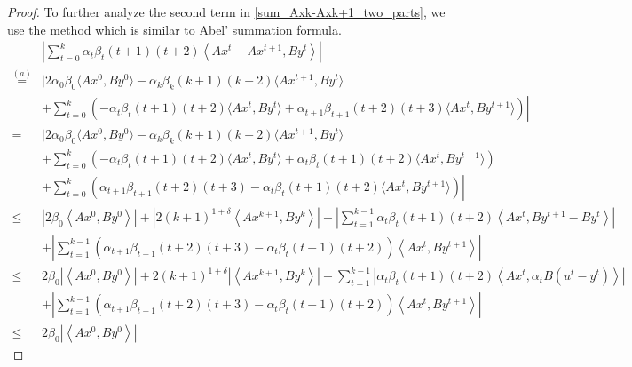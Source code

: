 \documentclass{article}
\numberwithin{equation}{section}
\begin{document}
\begin{proof}
    To further analyze the second term in \eqref{sum_Axk-Axk+1_two_parts}, we use the method which is 
    similar to Abel' summation formula. 
    \begin{align}
        &\left| \sum\limits_{t = 0}^k\alpha_t\beta_{t}(t+1)(t+2)\left\langle Ax^t- Ax^{t+1},By^t \right\rangle \right| \nonumber \\
        \overset{(a)}{=}& \Bigg| 2\alpha_0\beta_0 \langle Ax^0, By^0 \rangle -\alpha_k\beta_k(k+1)(k+2)\langle Ax^{t+1}, By^t \rangle  \nonumber \\
        &+\left.\sum\limits_{t=0}^k\left(-\alpha_t\beta_t(t+1)(t+2)\langle Ax^t, By^t \rangle+\alpha_{t+1}\beta_{t+1}(t+2)(t+3)
        \langle Ax^{t}, By^{t+1} \rangle\right) \right| \nonumber \\
        =& \Bigg| 2\alpha_0\beta_0 \langle Ax^0, By^0 \rangle -\alpha_k\beta_k(k+1)(k+2)\langle Ax^{t+1}, By^t \rangle  \nonumber \\
        &+\sum\limits_{t=0}^k\left(-\alpha_t\beta_t(t+1)(t+2)\langle Ax^t, By^t \rangle+\alpha_t\beta_{t}(t+1)(t+2) 
        \langle Ax^{t}, By^{t+1} \rangle\right)  \nonumber \\
        & \left.+ \sum\limits_{t=0}^k\left(\alpha_{t+1}\beta_{t+1}(t+2)(t+3) - \alpha_t\beta_t(t+1)(t+2)\langle Ax^t, By^{t+1} \rangle\right) \right| \nonumber \\
       \leq & \left| 2\beta_0 \left\langle Ax^0, By^0 \right\rangle \right|
        + \left|2(k+1)^{1+\delta}\left\langle  Ax^{k+1},By^k \right\rangle\right| +\left| \sum\limits_{t=1}^{k-1}\alpha_t \beta_{t}(t+1)(t+2) \left\langle Ax^t, By^{t+1}-By^t \right\rangle \right| \nonumber \\
        & + \left|\sum\limits_{t=1}^{k-1}\left(\alpha_{t+1}\beta_{t+1}(t+2)(t+3) - \alpha_t\beta_{t}(t+1)(t+2)\right)\left\langle Ax^t, By^{t+1} \right\rangle \right| \nonumber \\
        \overset{\mathop{(b)}}{\leq} & 2 \beta_0 \left| \left\langle Ax^0, By^0 \right\rangle \right|
        + 2(k+1)^{1+\delta} \left| \left\langle  Ax^{k+1},By^k \right\rangle\right| 
        + \sum\limits_{t=1}^{k-1} \left| \alpha_t \beta_{t} (t+1)(t+2) \left\langle Ax^t, \alpha_tB(u^t-y^t) \right\rangle \right| \nonumber \\
        & +\left|\sum\limits_{t=1}^{k-1}\left(\alpha_{t+1}\beta_{t+1}(t+2)(t+3) - \alpha_t\beta_{t}(t+1)(t+2)\right)\left\langle Ax^t, By^{t+1} \right\rangle \right|
        \nonumber \\
        \overset{\mathop{(c)}}{\leq} & 2 \beta_0 \left| \left\langle Ax^0, By^0 \right\rangle \right|

\end{align}
\end{proof}
\end{document}
